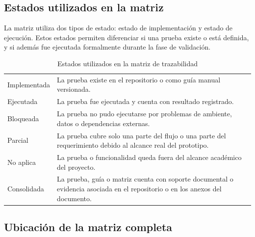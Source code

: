 \documentclass[12pt,letterpaper]{article}
\begin{document}
\subsection{Estados utilizados en la matriz}

La matriz utiliza dos tipos de estado: estado de implementación y estado de ejecución. Estos estados permiten diferenciar si una prueba existe o está definida, y si además fue ejecutada formalmente durante la fase de validación.

\begin{table}[H]
\centering
\begingroup
\scriptsize
\setlength{\tabcolsep}{3pt}
\renewcommand{\arraystretch}{1.22}

\begin{tabularx}{\textwidth}{|
>{\raggedright\arraybackslash}p{3.5cm}|
>{\raggedright\arraybackslash}X|}
\hline
\multicolumn{1}{|>{\centering\arraybackslash}m{3.5cm}|}{\textbf{Estado}} &
\multicolumn{1}{>{\centering\arraybackslash}m{10.8cm}|}{\textbf{Descripción}} \\
\hline

Implementada &
La prueba existe en el repositorio o como guía manual versionada. \\
\hline

Ejecutada &
La prueba fue ejecutada y cuenta con resultado registrado. \\
\hline

Bloqueada &
La prueba no pudo ejecutarse por problemas de ambiente, datos o dependencias externas. \\
\hline

Parcial &
La prueba cubre solo una parte del flujo o una parte del requerimiento debido al alcance real del prototipo. \\
\hline

No aplica &
La prueba o funcionalidad queda fuera del alcance académico del proyecto. \\
\hline

Consolidada &
La prueba, guía o matriz cuenta con soporte documental o evidencia asociada en el repositorio o en los anexos del documento. \\
\hline

\end{tabularx}

\endgroup
\caption{Estados utilizados en la matriz de trazabilidad}
\label{tab:estados-trazabilidad}
\end{table}

\subsection{Ubicación de la matriz completa}
\end{document}
